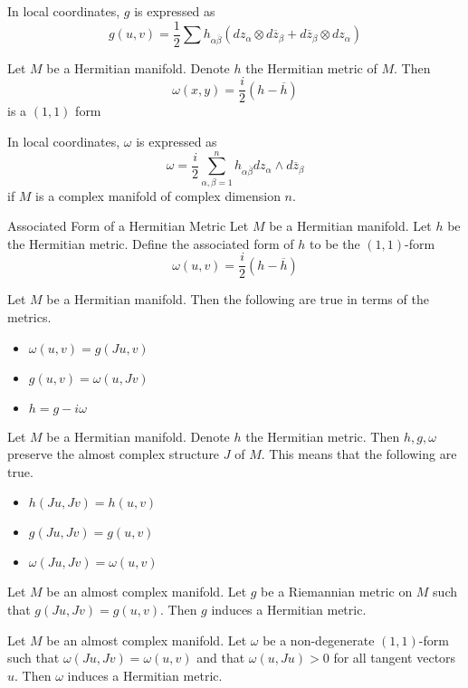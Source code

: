 \documentclass[a4paper]{article}
\begin{document}
In local coordinates, $g$ is expressed as $$g(u,v)=\frac{1}{2}\sum h_{\alpha\overline{\beta}}(dz_\alpha\otimes d\overline{z}_\beta+d\overline{z}_\beta\otimes dz_\alpha)$$

\begin{lmm}{}{} Let $M$ be a Hermitian manifold. Denote $h$ the Hermitian metric of $M$. Then $$\omega(x,y)=\frac{i}{2}(h-\overline{h})$$ is a $(1,1)$ form 
\end{lmm}

In local coordinates, $\omega$ is expressed as $$\omega=\frac{i}{2}\sum_{\alpha,\beta=1}^n h_{\alpha\overline{\beta}}dz_{\alpha}\wedge d\overline{z}_\beta$$ if $M$ is a complex manifold of complex dimension $n$. 

\begin{defn}{Associated Form of a Hermitian Metric}{} Let $M$ be a Hermitian manifold. Let $h$ be the Hermitian metric. Define the associated form of $h$ to be the $(1,1)$-form $$\omega(u,v)=\frac{i}{2}(h-\overline{h})$$
\end{defn}

\begin{prp}{}{} Let $M$ be a Hermitian manifold. Then the following are true in terms of the metrics. 
\begin{itemize}
\item $\omega(u,v)=g(Ju,v)$
\item $g(u,v)=\omega(u,Jv)$
\item $h=g-i\omega$
\end{itemize}
\end{prp}

\begin{thm}{}{} Let $M$ be a Hermitian manifold. Denote $h$ the Hermitian metric. Then $h,g,\omega$ preserve the almost complex structure $J$ of $M$. This means that the following are true. 
\begin{itemize}
\item $h(Ju,Jv)=h(u,v)$
\item $g(Ju,Jv)=g(u,v)$
\item $\omega(Ju,Jv)=\omega(u,v)$
\end{itemize}
\end{thm}

\begin{lmm}{}{} Let $M$ be an almost complex manifold. Let $g$ be a Riemannian metric on $M$ such that $g(Ju,Jv)=g(u,v)$. Then $g$ induces a Hermitian metric. 
\end{lmm}

\begin{lmm}{}{} Let $M$ be an almost complex manifold. Let $\omega$ be a non-degenerate $(1,1)$-form such that $\omega(Ju,Jv)=\omega(u,v)$ and that $\omega(u,Ju)>0$ for all tangent vectors $u$. Then $\omega$ induces a Hermitian metric. 
\end{lmm}
\end{document}
